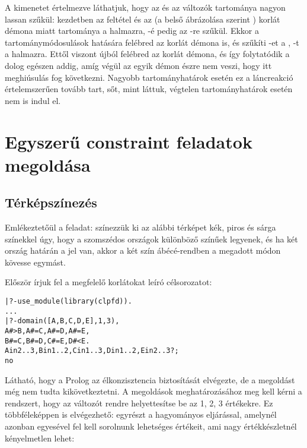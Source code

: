 A kimenetet értelmezve láthatjuk, hogy az  és az  változók
tartománya nagyon lassan szűkül: kezdetben az  feltétel
és az  (a \clpfd belső ábrázolása szerint )
korlát démona miatt  tartománya a  halmazra, -é pedig
az -re szűkül. Ekkor a tartománymódosulások hatására felébred
az  korlát démona is, és szűkíti -et a , -t
a  halmazra. Ettől viszont újból felébred az  korlát
démona, és így folytatódik a dolog egészen addig, amíg végül az egyik
démon észre nem veszi, hogy itt meghiúsulás fog következni. Nagyobb
tartományhatárok esetén ez a láncreakció értelemszerűen tovább tart, sőt,
mint láttuk, végtelen tartományhatárok esetén nem is indul el.

\section{Egyszerű constraint feladatok megoldása}

\subsection{Térképszínezés}

Emlékeztetőül a feladat: színezzük ki az alábbi térképet kék, piros és
sárga színekkel úgy, hogy a szomszédos országok különböző színűek legyenek,
és ha két ország határán a \cd{<} jel van, akkor a két szín ábécé-rendben
a megadott módon kövesse egymást.

\begin{center}\end{center}

Először írjuk fel a megfelelő korlátokat leíró \clpfd célsorozatot:

\begin{alltt}
| ?- use_module(library(clpfd)).
...
| ?- domain([A,B,C,D,E], 1, 3), 
     A #> B, A #\bs= C, A #\bs= D, A #\bs= E,
     B #\bs= C, B #\bs= D, C #\bs= E, D #< E.
A in 2..3, B in 1..2, C in 1..3, D in 1..2, E in 2..3 ? ;
no
\end{alltt}

Látható, hogy a Prolog az élkonzisztencia biztosítását elvégezte, de a
megoldást még nem tudta kikövetkeztetni. A megoldások meghatározásához
meg kell kérni a rendszert, hogy az  változót rendre helyettesítse
be az 1, 2, 3 értékekre. Ez többféleképpen is elvégezhető: egyrészt a
hagyományos  eljárással, amelynél azonban egyesével fel kell
sorolnunk  lehetséges értékeit, ami nagy értékkészletnél kényelmetlen
lehet:

